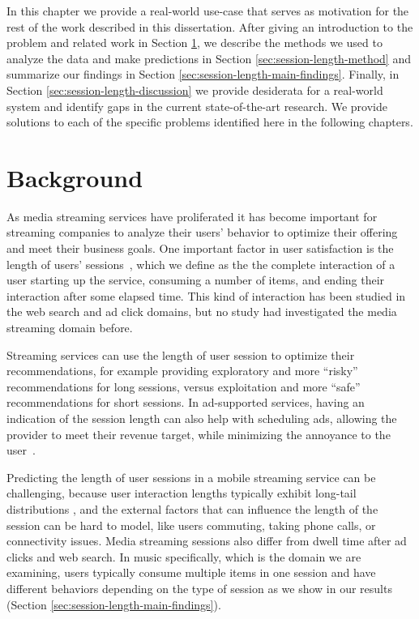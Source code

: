 In this chapter we provide a real-world use-case that serves as motivation
for the rest of the work described in this dissertation. After giving
an introduction to the problem and related work in Section \ref{sec:session-length-background},
we describe the methods we used to analyze the data and make predictions in
Section \ref{sec:session-length-method} and summarize our findings in Section
\ref{sec:session-length-main-findings}. Finally, in Section \ref{sec:session-length-discussion} we provide desiderata
for a real-world system and identify gaps in the current state-of-the-art
research. We provide solutions to each of the
specific problems identified here in the following chapters.

\section{Background}
\label{sec:session-length-background}

As media streaming services have proliferated it has become important for streaming
companies to analyze their users' behavior to optimize their offering and
meet their business goals. One important factor in user satisfaction is the length of
users' sessions~\cite{dwell-time-satisfaction}, which we define as the
the complete interaction of a
user starting up the service, consuming a number of items, and ending
their interaction after some elapsed time.
This kind of interaction has been studied in the web search \cite{dwell-time-satisfaction, search-time-model} and ad click \cite{post-click-ads, post-click-survival}
domains, but no study had investigated the media streaming domain before.

Streaming services can use the length of user session to optimize their
recommendations, for example providing exploratory and more ``risky'' recommendations
for long sessions, versus exploitation and more ``safe'' recommendations for short sessions.
In ad-supported services, having an indication of the session length can also help
with scheduling ads, allowing the provider to meet their revenue target, while
minimizing the annoyance to the user~\cite{annoying-ads}.

Predicting the length of user sessions in a mobile streaming service can be challenging,
because user interaction lengths
typically exhibit long-tail distributions \cite{post-click-survival, weibull-web-browsing, phonecalls}, and the external factors that can influence the length of the
session can be hard to model, like users commuting, taking phone calls, or connectivity
issues. Media streaming sessions also differ from dwell time after ad clicks
and web search. In music specifically, which is the domain we are examining,
users typically consume multiple items in one session and have different behaviors
depending on the type of session as we show in our results (Section \ref{sec:session-length-main-findings}).

